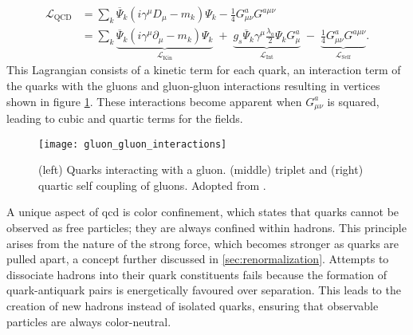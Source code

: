 \begin{align}
    {\mathcal {L}}_{\text{QCD}} & =\sum_k\overline{\Psi}_k\left( i \gamma^\mu D_\mu-m_k\right)\Psi_k-{\frac {1}{4}}G_{\mu \nu }^{a}G^{a\mu \nu} \\
                                & =\sum_k
    \underbrace{{\overline{\Psi}_k}\left(i\gamma^\mu \partial_\mu-m_k\right)\Psi_k}_{\mathcal{L}_\text{Kin}}
    \;+ \;
    \underbrace{g_s{\overline{\Psi}_k}\gamma ^{\mu }\frac{ \lambda_a}{2} \Psi_k G_\mu^a}_{\mathcal{L}_\text{Int}}
    \;-\;
    \underbrace{\frac{1}{4}G_{\mu \nu }^{a}G^{a\mu \nu}}_{\mathcal{L}_\text{Self}} .
    \label{eq:l_qcd}
\end{align}
This Lagrangian consists of a kinetic term for each quark, an interaction term of the quarks with the gluons and gluon-gluon interactions resulting in vertices shown in figure \ref{fig:qcd_vertices}. These interactions become apparent when $G^a_{\mu\nu}$ is squared, leading to cubic and quartic terms for the fields.

\begin{figure}[H]
    \centering
    \texttt{[image: gluon\_gluon\_interactions]}
    \caption[]{(left) Quarks interacting with a gluon. (middle) triplet and (right) quartic self coupling of gluons. Adopted from \citep{thomson2013modern}.}
    \label{fig:qcd_vertices}
\end{figure}

A unique aspect of \ac{qcd} is color confinement, which states that quarks cannot be observed as free particles; they are always confined within hadrons. This principle arises from the nature of the strong force, which becomes stronger as quarks are pulled apart, a concept further discussed in \ref{sec:renormalization}. Attempts to dissociate hadrons into their quark constituents fails because the formation of quark-antiquark pairs is energetically favoured over separation. This leads to the creation of new hadrons instead of isolated quarks, ensuring that observable particles are always color-neutral.


